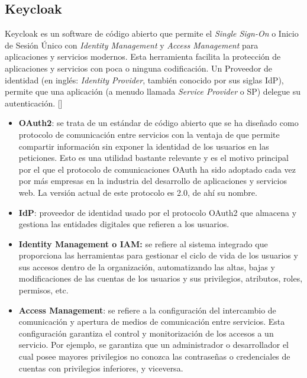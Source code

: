 \subsection{Keycloak}
Keycloak es un software de código abierto que permite el \textit{Single Sign-On} o Inicio de Sesión Único con \textit{Identity Management} y \textit{Access Management} para aplicaciones y servicios modernos. Esta herramienta facilita la protección de aplicaciones y servicios con poca o ninguna codificación. Un Proveedor de identidad (en inglés: \textit{Identity Provider}, también conocido por sus siglas IdP), permite que una aplicación (a menudo llamada \textit{Service Provider} o SP) delegue su autenticación. [\cite{KeycloakDoc}]

\begin{itemize}
	\item \textbf{OAuth2}: se trata de un estándar de código abierto que se ha diseñado como protocolo de comunicación entre servicios con la ventaja de que permite compartir información sin exponer la identidad de los usuarios en las peticiones. Esto es una utilidad bastante relevante y es el motivo principal por el que el protocolo de comunicaciones OAuth ha sido adoptado cada vez por más empresas en la industria del desarrollo de aplicaciones y servicios web. La versión actual de este protocolo es 2.0, de ahí su nombre.
	
	\item \textbf{IdP}: proveedor de identidad usado por el protocolo OAuth2 que almacena y gestiona las entidades digitales que refieren a los usuarios.
	
	\item \textbf{Identity Management o IAM: }se refiere al sistema integrado que proporciona las herramientas para gestionar el ciclo de vida de los usuarios y sus accesos dentro de la organización, automatizando las altas, bajas y modificaciones de las cuentas de los usuarios y sus privilegios, atributos, roles, permisos, etc.
	
	\item \textbf{Access Management}: se refiere a la configuración del intercambio de comunicación y apertura de medios de comunicación entre servicios. Esta configuración garantiza el control y monitorización de los accesos a un servicio. Por ejemplo, se garantiza que un administrador o desarrollador el cual posee mayores privilegios no conozca las contraseñas o credenciales de cuentas con privilegios inferiores, y viceversa. 
\end{itemize}

